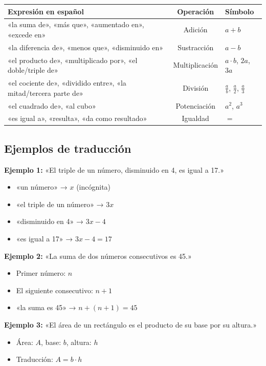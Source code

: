 \documentclass[12pt, a4paper]{article}
\begin{document}
\begin{center}
\small
\begin{tabular}{p{5.5cm} c p{4cm}}
\toprule
\textbf{Expresión en español} & \textbf{Operación} & \textbf{Símbolo} \\
\midrule
«la suma de», «más que», «aumentado en», «excede en» & Adición & $a + b$ \\
«la diferencia de», «menos que», «disminuido en» & Sustracción & $a - b$ \\
«el producto de», «multiplicado por», «el doble/triple de» & Multiplicación & $a \cdot b$, $2a$, $3a$ \\
«el cociente de», «dividido entre», «la mitad/tercera parte de» & División & $\frac{a}{b}$, $\frac{a}{2}$, $\frac{a}{3}$ \\
«el cuadrado de», «al cubo» & Potenciación & $a^2$, $a^3$ \\
«es igual a», «resulta», «da como resultado» & Igualdad & $=$ \\
\bottomrule
\end{tabular}
\end{center}

\subsection{Ejemplos de traducción}

\noindent\textbf{Ejemplo 1:} «El triple de un número, disminuido en 4, es igual a 17.»
\begin{itemize}
  \item «un número» → $x$ (incógnita)
  \item «el triple de un número» → $3x$
  \item «disminuido en 4» → $3x - 4$
  \item «es igual a 17» → $3x - 4 = 17$
\end{itemize}

\noindent\textbf{Ejemplo 2:} «La suma de dos números consecutivos es 45.»
\begin{itemize}
  \item Primer número: $n$
  \item El siguiente consecutivo: $n + 1$
  \item «la suma es 45» → $n + (n + 1) = 45$
\end{itemize}

\noindent\textbf{Ejemplo 3:} «El área de un rectángulo es el producto de su base por su altura.»
\begin{itemize}
  \item Área: $A$, base: $b$, altura: $h$
  \item Traducción: $A = b \cdot h$
\end{itemize}
\end{document}
